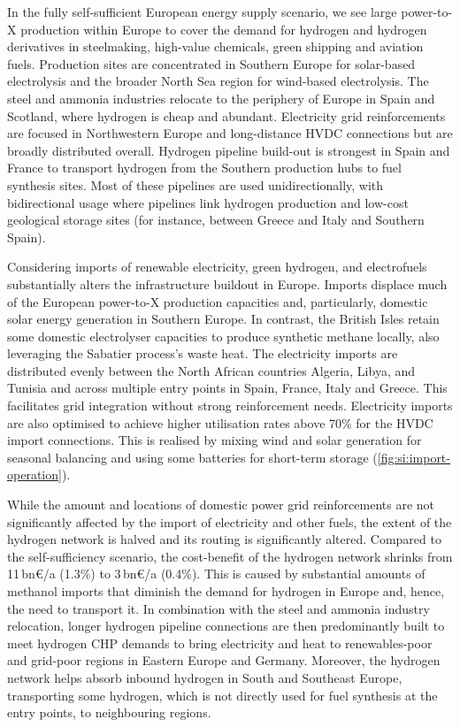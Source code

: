\documentclass[5p,10pt]{elsarticle}
\newcommand{\bneuro}[1]{#1\,bn\euro{}/a}
\begin{document}

In the fully self-sufficient European energy supply scenario, we see large
\mbox{power-to-X} production within Europe to cover the demand for hydrogen and
hydrogen derivatives in steelmaking, high-value chemicals, green shipping and
aviation fuels. Production sites are concentrated in Southern Europe for
solar-based electrolysis and the broader North Sea region for wind-based
electrolysis. The steel and ammonia industries relocate to the periphery of
Europe in Spain and Scotland, where hydrogen is cheap and abundant. Electricity
grid reinforcements are focused in Northwestern Europe and long-distance HVDC
connections but are broadly distributed overall. Hydrogen pipeline build-out is
strongest in Spain and France to transport hydrogen from the Southern production
hubs to fuel synthesis sites. Most of these pipelines are used unidirectionally,
with bidirectional usage where pipelines link hydrogen production and low-cost
geological storage sites (for instance, between Greece and Italy and Southern
Spain).


Considering imports of renewable electricity, green hydrogen, and electrofuels
substantially alters the infrastructure buildout in Europe. Imports displace
much of the European power-to-X production capacities and, particularly,
domestic solar energy generation in Southern Europe. In contrast, the British
Isles retain some domestic electrolyser capacities to produce synthetic methane
locally, also leveraging the Sabatier process's waste heat. The electricity
imports are distributed evenly between the North African countries Algeria,
Libya, and Tunisia and across multiple entry points in Spain, France, Italy and
Greece. This facilitates grid integration without strong reinforcement needs.
Electricity imports are also optimised to achieve higher utilisation rates above
70\% for the HVDC import connections. This is realised by mixing wind and solar
generation for seasonal balancing and using some batteries for short-term
storage (\cref{fig:si:import-operation}).

While the amount and locations of domestic power grid reinforcements are not
significantly affected by the import of electricity and other fuels, the extent
of the hydrogen network is halved and its routing is significantly altered.
Compared to the self-sufficiency scenario, the cost-benefit of the hydrogen
network shrinks from \bneuro{11} (1.3\%) to \bneuro{3} (0.4\%). This is caused
by substantial amounts of methanol imports that diminish the demand for hydrogen
in Europe and, hence, the need to transport it. In combination with the steel
and ammonia industry relocation, longer hydrogen pipeline connections are then
predominantly built to meet hydrogen CHP demands to bring electricity and heat
to renewables-poor and grid-poor regions in Eastern Europe and Germany.
Moreover, the hydrogen network helps absorb inbound hydrogen in South and
Southeast Europe, transporting some hydrogen, which is not directly used for
fuel synthesis at the entry points, to neighbouring regions.
\end{document}
